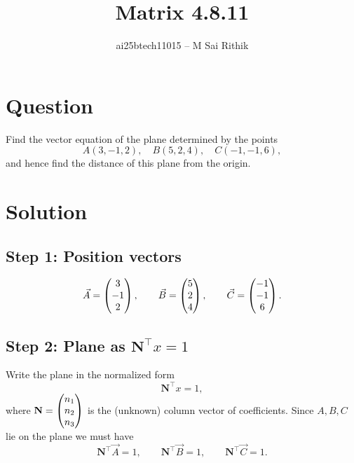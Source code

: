\documentclass[12pt]{article}
\title{Matrix 4.8.11}
\author{ai25btech11015 -- M Sai Rithik}
\date{}
\begin{document}
\maketitle

\section*{Question}
Find the vector equation of the plane determined by the points
\[
A(3,-1,2),\quad B(5,2,4),\quad C(-1,-1,6),
\]
and hence find the distance of this plane from the origin.  


\section*{Solution}

\subsection*{Step 1: Position vectors}
\begin{equation}
\Vec{A} = \begin{pmatrix}3\\-1\\2\end{pmatrix},\qquad
\Vec{B} = \begin{pmatrix}5\\2\\4\end{pmatrix},\qquad
\Vec{C} = \begin{pmatrix}-1\\-1\\6\end{pmatrix}.
\label{eq:points}
\end{equation}

\subsection*{Step 2: Plane as $\mathbf{N}^{\!\top}x = 1$}
Write the plane in the normalized form
\begin{equation}
\mathbf{N}^{\!\top} x = 1,
\label{eq:plane1}
\end{equation}
where \(\mathbf{N}=\begin{pmatrix}n_1\\n_2\\n_3\end{pmatrix}\) is the (unknown) column vector of coefficients.  
Since \(A,B,C\) lie on the plane we must have
\begin{equation}
\mathbf{N}^{\!\top}\Vec{A} = 1,\qquad
\mathbf{N}^{\!\top}\Vec{B} = 1,\qquad
\mathbf{N}^{\!\top}\Vec{C} = 1.
\label{eq:pointconds}
\end{equation}
\end{document}
